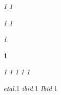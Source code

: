 \usepackage{soul}  %

\let\booktitle\textit
\soulregister\booktitle{1}
\let\book\textit
\soulregister\book{1}

\let\journaltitle\textit
\soulregister\journaltitle{1}
\let\journal\textit
\soulregister\journal{1}

\let\newspaper\textit
\soulregister\newspaper{1}

\let\vol\textbf
\soulregister\vol{1}  %

\let\latin\textit
\soulregister\latin{1}  
\let\french\textit
\soulregister\french{1}
\let\greek\textit
\soulregister\greek{1}
\let\german\textit
\soulregister\german{1}
\let\italian\textit
\soulregister\italian{1}


\newcommand{\etal}{\textit{et\hairsp{}al.}\xspace}  %
\soulregister\etal{1}
\newcommand{\ibid}{\textit{ibid.}\xspace}  %
\soulregister\ibid{1}
\newcommand{\Ibid}{\textit{Ibid.}\xspace}  %
\soulregister\Ibid{1}
